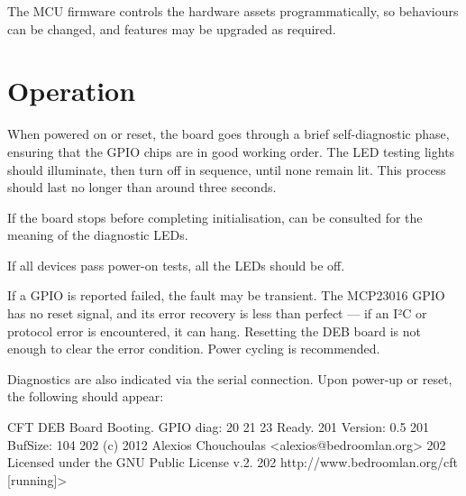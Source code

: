 The \gls{MCU} firmware controls the hardware assets programmatically,
so behaviours can be changed, and features may be upgraded as
required.

\section{Operation}
\label{sec-deb-firmware}

When powered on or reset, the board goes through a brief
self-diagnostic phase, ensuring that the \gls{GPIO} chips are in good
working order. The LED testing lights should illuminate, then turn off
in sequence, until none remain lit. This process should last
no longer than around three seconds.

If the board stops before completing initialisation,
 can be consulted for the meaning of the diagnostic
LEDs.

If all devices pass power-on tests, all the LEDs should be off.

If a \gls{GPIO} is reported failed, the fault may be transient. The
MCP23016 \gls{GPIO} has no reset signal, and its error recovery is
less than perfect — if an I²C or protocol error is encountered, it can
hang. Resetting the \gls{DEB} board is not enough to clear the error
condition. Power cycling is recommended.

Diagnostics are also indicated via the serial connection. Upon
power-up or reset, the following should appear:

\begin{debcode}
CFT DEB Board Booting.
GPIO diag: 20 21 23 Ready.
201 Version: 0.5
201 BufSize: 104
202 (c) 2012 Alexios Chouchoulas <alexios@bedroomlan.org>
202 Licensed under the GNU Public License v.2.
202 http://www.bedroomlan.org/cft
[running]>
\end{debcode}

\newcommand\led[1]{%
  \ifxetex
    \begin{tikzpicture}
      \draw[line width=1pt, fill=#1] (0,0) circle(4pt);
    \end{tikzpicture}
  \else
    \HCode{<span class="led #1">&\#9679;</span>}
  \fi
}

